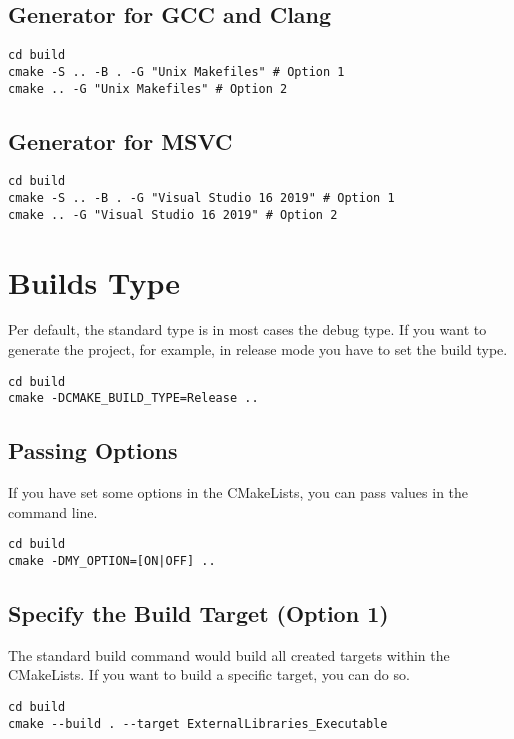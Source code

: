 \documentclass[openany]{report}
\begin{document}
\subsection{Generator for GCC and Clang}

\begin{verbatim}
cd build
cmake -S .. -B . -G "Unix Makefiles" # Option 1
cmake .. -G "Unix Makefiles" # Option 2
\end{verbatim}

\subsection{Generator for MSVC}

\begin{verbatim}
cd build
cmake -S .. -B . -G "Visual Studio 16 2019" # Option 1
cmake .. -G "Visual Studio 16 2019" # Option 2
\end{verbatim}

\section{Builds Type}

Per default, the standard type is in most cases the debug type.
If you want to generate the project, for example, in release mode you have to set the build type.

\begin{verbatim}
cd build
cmake -DCMAKE_BUILD_TYPE=Release ..
\end{verbatim}

\subsection{Passing Options}

If you have set some options in the CMakeLists, you can pass values in the command line.

\begin{verbatim}
cd build
cmake -DMY_OPTION=[ON|OFF] ..
\end{verbatim}

\subsection{Specify the Build Target (Option 1)}

The standard build command would build all created targets within the CMakeLists.
If you want to build a specific target, you can do so.

\begin{verbatim}
cd build
cmake --build . --target ExternalLibraries_Executable
\end{verbatim}
\end{document}
